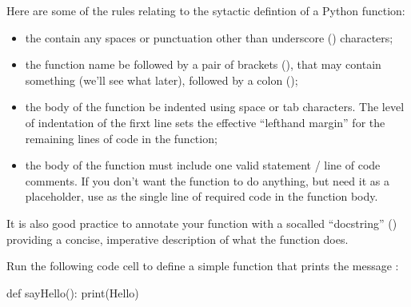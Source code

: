 \documentclass[letterpaper,10pt,english]{sphinxmanual}
\begin{document}
Here are some of the rules relating to the sytactic defintion of a Python function:
\begin{itemize}
\item {} 
the   contain any spaces or punctuation other than underscore (\sphinxcode{\sphinxupquote{\_}}) characters;

\item {} 
the function name  be followed by a pair of brackets (\sphinxcode{\sphinxupquote{()}}), that may contain something (we’ll see what later), followed by a colon (\sphinxcode{\sphinxupquote{:}});

\item {} 
the body of the function  be indented using space or tab characters. The level of indentation of the firxt line sets the effective “left\sphinxhyphen{}hand margin” for the remaining lines of code in the function;

\item {} 
the body of the function must include  one valid statement / line of code  comments. If you don’t want the function to do anything, but need it as a placeholder, use  as the single line of required code in the function body.

\end{itemize}

It is also good practice to annotate your function with a so\sphinxhyphen{}called “docstring” () providing a concise, imperative description of what the function does.

\begin{sphinxVerbatim}[commandchars=\\\{\}]
 
\end{sphinxVerbatim}

Run the following code cell to define a simple function that prints the message :

{
\begin{sphinxVerbatim}[commandchars=\\\{\}]
\llap{\color{nbsphinxin}[ ]:\,\hspace{\fboxrule}\hspace{\fboxsep}}def sayHello():
    print(\PYGZsq{}Hello\PYGZsq{})
\end{sphinxVerbatim}
}
\end{document}
